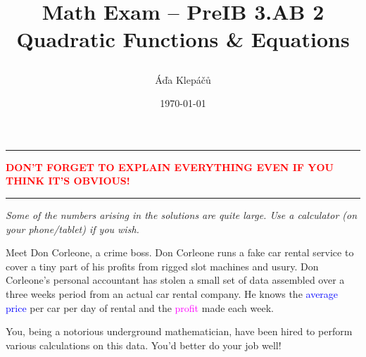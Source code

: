 \documentclass[a4paper,11pt]{article}
\title{\Huge\textsf{Math Exam -- PreIB 3.AB 2}\\
 \Large\textsf{Quadratic Functions \& Equations}
 \author{Áďa Klepáčů}
 \date{\today}
}
\newcommand{\clr}{\textcolor{red}}
\newcommand{\clb}{\textcolor{blue}}
\newcommand{\clm}{\textcolor{magenta}}
\begin{document}
\maketitle
\thispagestyle{fancy}

\begin{center}
 \hrule
 \textbf{\clr{DON'T FORGET TO EXPLAIN EVERYTHING EVEN IF YOU THINK IT'S
 OBVIOUS!}}
 \vspace{2ex}
 \hrule
 \emph{Some of the numbers arising in the solutions are quite large. Use a
 calculator (on your phone/tablet) if you wish.}
\end{center}

Meet Don Corleone, a crime boss. Don Corleone runs a fake car rental service to
cover a tiny part of his profits from rigged slot machines and usury. Don
Corleone's personal accountant has stolen a small set of data assembled over a
three weeks period from an actual car rental company. He knows the \clb{average
price} per car per day of rental and the \clm{profit} made each week.

You, being a notorious underground mathematician, have been hired to perform
various calculations on this data. You'd better do your job well!
\end{document}
